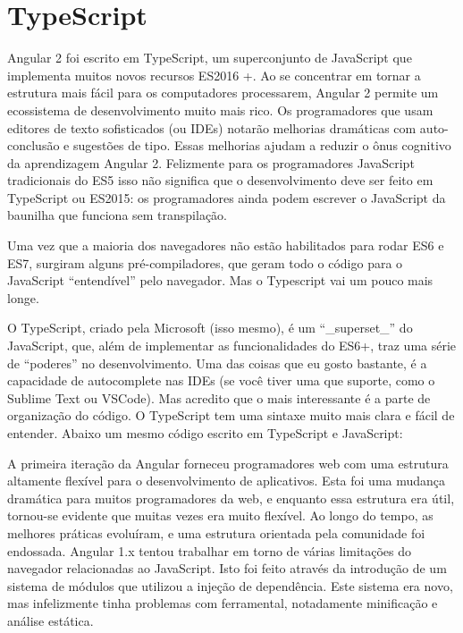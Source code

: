 \documentclass[12pt]{article}
\begin{document}
\section{TypeScript} \label{sec:firstpage}

Angular 2 foi escrito em TypeScript, um superconjunto de JavaScript que implementa muitos novos recursos ES2016 +.
Ao se concentrar em tornar a estrutura mais fácil para os computadores processarem, Angular 2 permite um ecossistema de desenvolvimento muito mais rico. Os programadores que usam editores de texto sofisticados (ou IDEs) notarão melhorias dramáticas com auto-conclusão e sugestões de tipo. Essas melhorias ajudam a reduzir o ônus cognitivo da aprendizagem Angular 2. Felizmente para os programadores JavaScript tradicionais do ES5 isso não significa que o desenvolvimento deve ser feito em TypeScript ou ES2015: os programadores ainda podem escrever o JavaScript da baunilha que funciona sem transpilação.

Uma vez que a maioria dos navegadores não estão habilitados para rodar ES6 e ES7, surgiram alguns pré-compiladores, que geram todo o código para o JavaScript “entendível” pelo navegador. Mas o Typescript vai um pouco mais longe.

O TypeScript, criado pela Microsoft (isso mesmo), é um “\_superset\_” do JavaScript, que, além de implementar as funcionalidades do ES6+, traz uma série de “poderes” no desenvolvimento. Uma das coisas que eu gosto bastante, é a capacidade de autocomplete nas IDEs (se você tiver uma que suporte, como o Sublime Text ou VSCode). Mas acredito que o mais interessante é a parte de organização do código. O TypeScript tem uma sintaxe muito mais clara e fácil de entender. Abaixo um mesmo código escrito em TypeScript e JavaScript:

A primeira iteração da Angular forneceu programadores web com uma estrutura altamente flexível para o desenvolvimento de aplicativos. Esta foi uma mudança dramática para muitos programadores da web, e enquanto essa estrutura era útil, tornou-se evidente que muitas vezes era muito flexível. Ao longo do tempo, as melhores práticas evoluíram, e uma estrutura orientada pela comunidade foi endossada.
Angular 1.x tentou trabalhar em torno de várias limitações do navegador relacionadas ao JavaScript. Isto foi feito através da introdução de um sistema de módulos que utilizou a injeção de dependência. Este sistema era novo, mas infelizmente tinha problemas com ferramental, notadamente minificação e análise estática.
\end{document}
